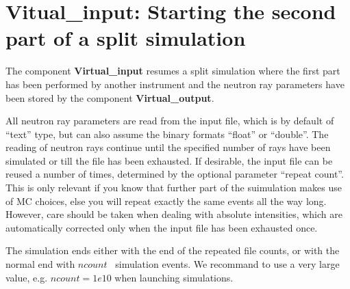 \section{Vitual\_input: Starting the second part of a split simulation}
\label{virtual_input}


The component {\bf Virtual\_input} resumes a split simulation where the
first part has been performed by another instrument and the neutron ray
parameters have been stored by the component {\bf Virtual\_output}.

All neutron ray parameters are read from the input file, which is by default
of ``text'' type, but can also assume the binary formats
``float'' or ``double''. The reading of neutron rays continue until the
specified number of rays have been simulated or
till the file has been exhausted. If desirable, the input file
can be reused a number of times, determined by the optional parameter
``repeat count''. This is only relevant if you know that further part of the suimulation makes use of MC choices, else you will repeat exactly the same events all the way long. However, care should be taken when dealing with
absolute intensities, which are automatically corrected only
when the input file has been exhausted once.

The simulation ends either with the end of the repeated file counts, or with the normal end with $ncount$ \MCS\ simulation events. We recommand to use a very large value, e.g. $ncount=1e10$ when launching simulations.
